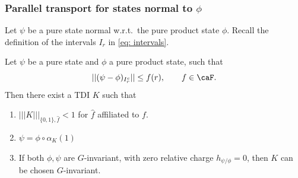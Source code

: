 \subsubsection{Parallel transport for states normal to $\phi$}
Let $\psi$ be a pure state normal w.r.t.\ the pure product state $\phi$.
Recall the definition of the intervals $I_r$ in \eqref{eq: intervals}. 
\begin{lemma}\label{lem: parallel transport}
	Let $\psi$ be a  pure state and $\phi$ a pure product state, such that
	\begin{equation}\label{eq: one-sided bounds repeat}
		|| (\psi-\phi)_{I_r^c} || \leq f(r),\qquad f \in \caF.
	\end{equation}
	Then there exist a  TDI $K$ such that 
	\begin{enumerate}
		\item   $|||K|||_{\{0,1\},\hat{f}} <1$ for $\hat{f}$ affiliated to $f$.  
		\item $\psi = \phi\circ \alpha_K(1)$
		\item  If both $\phi,\psi$ are $G$-invariant, with zero relative charge $h_{\psi/\phi}=0$, then $K$ can be chosen $G$-invariant.
	\end{enumerate}
\end{lemma}
